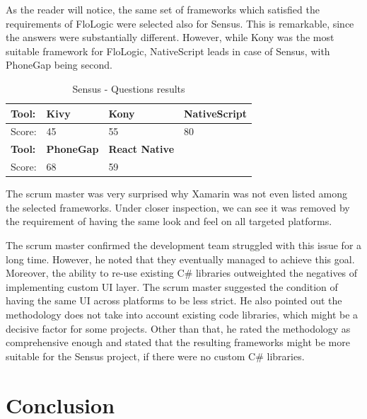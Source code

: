\documentclass[english,master,public,dept460,male,cpdeclaration,oneside]{diploma}
\begin{document}
As the reader will notice, the same set of frameworks which satisfied the requirements of FloLogic were selected also for Sensus. This is remarkable, since the answers were substantially different. However, while Kony was the most suitable framework for FloLogic, NativeScript leads in case of Sensus, with PhoneGap being second.

\begin{table}[!h]
	\centering
	\caption{Sensus - Questions results}
	\begin{tabular}{p{4cm} | p{3cm} | p{3cm} | p{3cm}}
		\toprule		
		\textbf{Tool:} & \textbf{Kivy} & \textbf{Kony} & \textbf{NativeScript} \\ 
		\midrule
		Score: & 45 & 55 & 80 \\ 
		\midrule
		\textbf{Tool:} & \textbf{PhoneGap} & \textbf{React Native} & \\
		\midrule
		Score: & 68 & 59 & \\
		\midrule
	\end{tabular}
\end{table}

The scrum master was very surprised why Xamarin was not even listed among the selected frameworks. Under closer inspection, we can see it was removed by the requirement of having the same look and feel on all targeted platforms.

The scrum master confirmed the development team struggled with this issue for a long time. However, he noted that they eventually managed to achieve this goal. Moreover, the ability to re-use existing C\# libraries outweighted the negatives of implementing custom UI layer. The scrum master suggested the condition of having the same UI across platforms to be less strict. He also pointed out the methodology does not take into account existing code libraries, which might be a decisive factor for some projects. Other than that, he rated the methodology as comprehensive enough and stated that the resulting frameworks might be more suitable for the Sensus project, if there were no custom C\# libraries.

\section{Conclusion}
\end{document}

